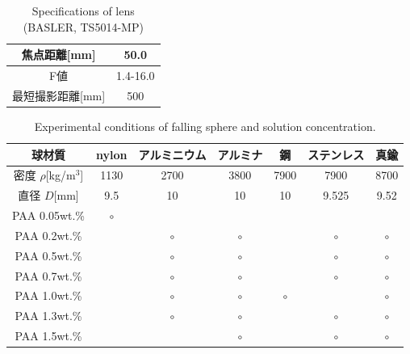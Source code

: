 \begin{table}[ht]
    \centering
    \caption{Specifications of lens (BASLER, TS5014-MP)}
    \label{table:lens}
    \begin{tabular}{c|c}\hline
        焦点距離[mm]     & 50.0     \\ \hline
        F値              & 1.4-16.0 \\ \hline
        最短撮影距離[mm] & 500      \\ \hline
    \end{tabular}
\end{table}

\begin{table}[H]
    \centering
    \caption{Experimental conditions of falling sphere and solution concentration.}
    \label{table:exp-conditions}
    \begin{tabular}{c|c|c|c|c|c|c}\hline
        球材質                & nylon   & アルミニウム & アルミナ & 鋼      & ステンレス & 真鍮    \\ \hline
        密度 $\rho$[kg/m$^3$] & 1130    & 2700         & 3800     & 7900    & 7900       & 8700    \\ \hline
        直径 $D$[mm]          & 9.5     & 10           & 10       & 10      & 9.525      & 9.52    \\ \hline \hline
        PAA 0.05wt.\%         & $\circ$ &              &          &         &            &         \\ \hline
        PAA 0.2wt.\%          &         & $\circ$      & $\circ$  &         & $\circ$    & $\circ$ \\ \hline
        PAA 0.5wt.\%          &         & $\circ$      & $\circ$  &         & $\circ$    & $\circ$ \\ \hline
        PAA 0.7wt.\%          &         & $\circ$      & $\circ$  &         & $\circ$    & $\circ$ \\ \hline
        PAA 1.0wt.\%          &         & $\circ$      & $\circ$  & $\circ$ &            & $\circ$ \\ \hline
        PAA 1.3wt.\%          &         & $\circ$      & $\circ$  &         & $\circ$    & $\circ$ \\ \hline
        PAA 1.5wt.\%          &         &              & $\circ$  &         & $\circ$    & $\circ$ \\ \hline
    \end{tabular}
\end{table}

